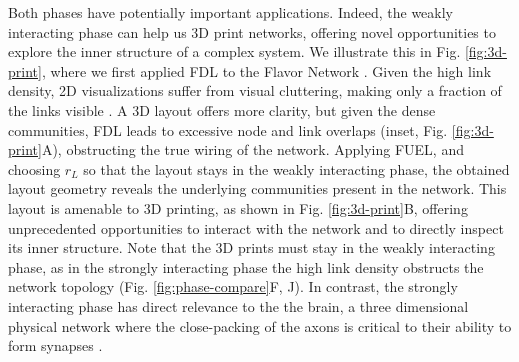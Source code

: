 \documentclass[endfloats,nofootinbib,preprint,floatfix,titlepage,superscriptaddress]{revtex4} %
\begin{document}
Both phases have potentially important applications. 
Indeed, the weakly interacting phase can help us 3D print networks, offering novel opportunities to explore the inner structure of a complex system. 
We illustrate this in Fig. \ref{fig:3d-print}, where we first applied FDL to the Flavor Network \cite{ahn2011flavor}.
Given the high link density, 2D visualizations suffer from visual cluttering, making only a fraction of the links visible \cite{ahn2011flavor}. 
A 3D layout offers more clarity, but %
given the dense communities, FDL leads to excessive node and link overlaps (inset, Fig. \ref{fig:3d-print}A), obstructing the true wiring of the network. 
Applying FUEL, and choosing $r_L$ so that the layout stays in the weakly interacting phase, the obtained layout geometry reveals the underlying  communities present in the network. 
This layout is amenable to 3D printing, as shown in Fig. \ref{fig:3d-print}B, offering unprecedented opportunities to interact with the network and to directly inspect its inner structure.
Note that the 3D prints must stay in the weakly interacting phase, as in the strongly interacting phase the high link density obstructs the network topology (Fig. \ref{fig:phase-compare}F, J).
In contrast, the strongly interacting phase has direct relevance to the the brain, a three dimensional physical network where the close-packing of the axons is critical to their ability to form synapses \cite{stepanyants2002geometry,rivera2011wiring}. 
\end{document}
